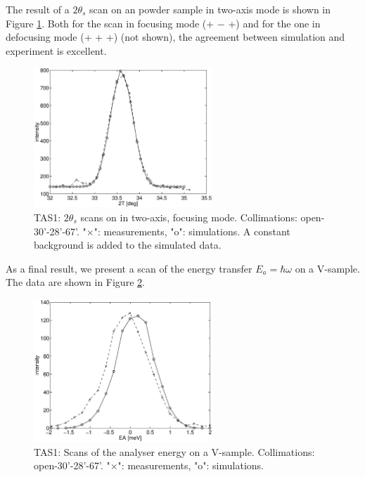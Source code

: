 The result of a $2\theta_s$ scan on an 
powder sample in two-axis mode is shown in Figure \ref{f:al2o3}.
Both for the scan in focusing mode (+ $-$ +)
and for the one in defocusing mode (+ + +) (not shown),
the agreement between simulation and experiment is excellent.

\begin{figure}
  \begin{center}
    \includegraphics[width=0.6\textwidth]{figures/al2o3-focus.eps}
  \end{center}
\caption{TAS1: $2\theta_s$ scans on  in two-axis, focusing mode.
Collimations: open-30'-28'-67'.
"$\times$": measurements, "o": simulations.
A constant background is added to the simulated data.}
\label{f:al2o3}
\end{figure}

As a final result, we present a scan of the energy
transfer $E_a = \hbar \omega$ on a V-sample.
The data are shown in Figure \ref{f:v_ea}.

\begin{figure}
  \begin{center}
    \includegraphics[width=0.6\textwidth]{figures/ea-scan.eps}
  \end{center}
\caption{TAS1: Scans of the analyser energy on a V-sample.
Collimations: open-30'-28'-67'.
"$\times$": measurements, "o": simulations.}
\label{f:v_ea}
\end{figure}


